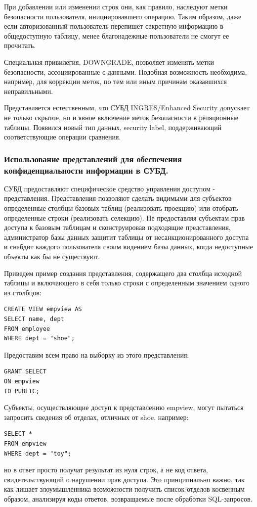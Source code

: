 При добавлении или изменении строк они, как правило, наследуют метки безопасности пользователя, инициировавшего операцию. Таким образом, даже если авторизованный пользователь перепишет секретную информацию в общедоступную таблицу, менее благонадежные пользователи не смогут ее прочитать.

Специальная привилегия, DOWNGRADE, позволяет изменять метки безопасности, ассоциированные с данными. Подобная возможность необходима, например, для коррекции меток, по тем или иным причинам оказавшихся неправильными.

Представляется естественным, что СУБД INGRES/Enhanced Security допускает не только скрытое, но и явное включение меток безопасности в реляционные таблицы. Появился новый тип данных, security label, поддерживающий соответствующие операции сравнения.

\subsubsection{Использование представлений для обеспечения конфиденциальности
информации в СУБД.}

СУБД предоставляют специфическое средство управления доступом - представления. Представления позволяют сделать видимыми для субъектов определенные столбцы базовых таблиц (реализовать проекцию) или отобрать определенные строки (реализовать селекцию). Не предоставляя субъектам прав доступа к базовым таблицам и сконструировав подходящие представления, администратор базы данных защитит таблицы от несанкционированного доступа и снабдит каждого пользователя своим видением базы данных, когда недоступные объекты как бы не существуют.

Приведем пример создания представления, содержащего два столбца исходной таблицы и включающего в себя только строки с определенным значением одного из столбцов:
\begin{lstlisting}[style=mystyle]
CREATE VIEW empview AS
SELECT name, dept
FROM employee
WHERE dept = "shoe";
\end{lstlisting}
Предоставим всем право на выборку из этого представления:
\begin{lstlisting}[style=mystyle]
GRANT SELECT
ON empview
TO PUBLIC;
\end{lstlisting}
Субъекты, осуществляющие доступ к представлению empview, могут пытаться запросить сведения об отделах, отличных от shoe, например:
\begin{lstlisting}[style=mystyle]
SELECT *
FROM empview
WHERE dept = "toy";
\end{lstlisting}
но в ответ просто получат результат из нуля строк, а не код ответа, свидетельствующий о нарушении прав доступа. Это принципиально важно, так как лишает злоумышленника возможности получить список отделов косвенным образом, анализируя коды ответов, возвращаемые после обработки SQL-запросов.
